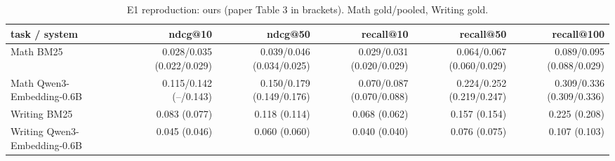\begin{table}[t]
\centering\small
\caption{E1 reproduction: ours (paper Table 3 in brackets). Math gold/pooled, Writing gold.}
\label{tab:e1}
\begin{tabular}{lrrrrr}
\toprule
task / system & ndcg@10 & ndcg@50 & recall@10 & recall@50 & recall@100 \\
\midrule
Math BM25 & 0.028/0.035 (0.022/0.029) & 0.039/0.046 (0.034/0.025) & 0.029/0.031 (0.020/0.029) & 0.064/0.067 (0.060/0.029) & 0.089/0.095 (0.088/0.029) \\
Math Qwen3-Embedding-0.6B & 0.115/0.142 (–/0.143) & 0.150/0.179 (0.149/0.176) & 0.070/0.087 (0.070/0.088) & 0.224/0.252 (0.219/0.247) & 0.309/0.336 (0.309/0.336) \\
Writing BM25 & 0.083 (0.077) & 0.118 (0.114) & 0.068 (0.062) & 0.157 (0.154) & 0.225 (0.208) \\
Writing Qwen3-Embedding-0.6B & 0.045 (0.046) & 0.060 (0.060) & 0.040 (0.040) & 0.076 (0.075) & 0.107 (0.103) \\
\bottomrule
\end{tabular}
\end{table}

